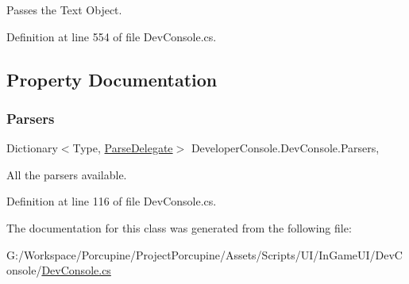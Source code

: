Passes the Text Object. 



Definition at line 554 of file Dev\+Console.\+cs.



\subsection{Property Documentation}
\mbox{\label{class_developer_console_1_1_dev_console_aacf3a497357bcc16ce4bbb9428472136}} 
\subsubsection{\texorpdfstring{Parsers}{Parsers}}
{\footnotesize\ttfamily Dictionary$<$Type, \hyperlink{namespace_developer_console_a62e10d7e4aeed7c6bcd4a780468c74fa}{Parse\+Delegate}$>$ Developer\+Console.\+Dev\+Console.\+Parsers\hspace{0.3cm}{\ttfamily [static]}, {\ttfamily [get]}}



All the parsers available. 



Definition at line 116 of file Dev\+Console.\+cs.



The documentation for this class was generated from the following file\+:\begin{DoxyCompactItemize}
\item 
G\+:/\+Workspace/\+Porcupine/\+Project\+Porcupine/\+Assets/\+Scripts/\+U\+I/\+In\+Game\+U\+I/\+Dev\+Console/\hyperlink{_dev_console_8cs}{Dev\+Console.\+cs}\end{DoxyCompactItemize}

